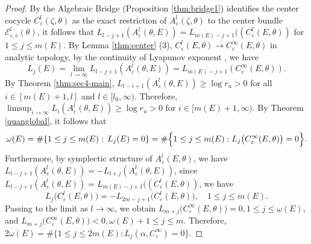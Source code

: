 \documentclass[reqno,11pt]{amsart}
\begin{document}
\begin{proof}
By the Algebraic Bridge  (Proposition \ref{thm:bridge1})  identifies the center cocycle $C^l_\varepsilon(\zeta,\theta)$ as the exact restriction of $A^l_\varepsilon(\zeta,\theta)$ to the center bundle $\mathcal{E}^l_{\varepsilon,c}(\theta)$, it follows that  $L_{l-j+1}(A^{l}_{\varepsilon}(\theta,E))=L_{m(E)-j+1}((C_{\varepsilon}^{l}(E,\theta))$ for $1\leq j\leq m(E)$. By Lemma \ref{thm:center} (3),   $C_{\varepsilon}^{l}(E,\theta)\rightarrow C_{\varepsilon}^{\infty}(E,\theta)$ in analytic topology, by the continuity of Lyapunov exponent \cite{AJS}, we have $$L_j(E)=\lim_{l\to\infty}L_{l-j+1}(A^{l}_{\varepsilon}(\theta,E))=L_{m(E)-j+1}(C_{\varepsilon}^{\infty}(E,\theta)).$$
 By Theorem \ref{thm:sec4-main}, $L_{l-i+1}(A^{l}_{\varepsilon}(\theta,E))\geq \log r_u>0$ for all $i\in[m(E)+1,l]$ and $l\in[l_0,\infty).$ Therefore, $\limsup_{i\to\infty} L_i(A^{l}_{\varepsilon}(\theta,E))\geq \log r_u>0$ for $i\in[m(E)+1,\infty)$. By Theorem \ref{quanglobal}, it follows that
$$\omega(E)=\#\{1\leq j\leq m(E):\,L_j(E)=0\}=\#\Bigl\{1\leq j\leq m(E):
 L_j\bigl(C_{\varepsilon}^{\infty}(E,\theta)\bigr)=0 \Bigr\}.$$
Furthermore, by symplectic structure of $A_{\varepsilon}^{l}(E,\theta)$,
we have $L_{l-j+1}(A^{l}_{\varepsilon}(\theta,E))=-L_{l+j}(A^{l}_{\varepsilon}(\theta,E))$, since
$
L_{l-j+1}(A^{l}_{\varepsilon}(\theta,E))=L_{m(E)-j+1}((C_{\varepsilon}^{l}(E,\theta))$, we have
$$
L_j\bigl(C_{\varepsilon}^{l}(E,\theta)\bigr)
=-L_{2m-j+1}\bigl(C_{\varepsilon}^{l}(E,\theta)\bigr),\quad 1\leq j\leq m(E).
$$
Passing to the limit as $l\to\infty$, we obtain
$
L_{m+j}\bigl(C_{\varepsilon}^{\infty}(E,\theta)\bigr)=0,
 1\leq j\leq \omega(E),
$
and
$
L_{m+j}\bigl(C_{\varepsilon}^{\infty}(E,\theta)\bigr)<0,
 \omega(E)+1\leq j\leq m.
$
Therefore, $2\omega(E)=\#\bigl\{1\leq j\leq 2m(E): L_j(\alpha, C_{\varepsilon}^{\infty}) = 0\bigr\}.$
\end{proof}
\end{document}
